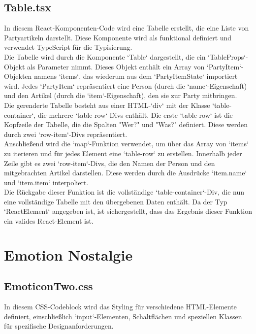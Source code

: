 \documentclass[./dokumentation.tex]{subfiles}
\begin{document}
\subsection{Table.tsx}

In diesem React-Komponenten-Code wird eine Tabelle erstellt, die eine Liste von Partyartikeln darstellt. Diese Komponente wird als funktional definiert und verwendet TypeScript für die Typisierung.\\
Die Tabelle wird durch die Komponente `Table` dargestellt, die ein `TableProps`-Objekt als Parameter nimmt. Dieses Objekt enthält ein Array von `PartyItem`-Objekten namens `items`, das wiederum aus dem `PartyItemState` importiert wird. Jedes `PartyItem` repräsentiert eine Person (durch die `name`-Eigenschaft) und den Artikel (durch die `item`-Eigenschaft), den sie zur Party mitbringen.\\
Die gerenderte Tabelle besteht aus einer HTML-`div` mit der Klasse `table-container`, die mehrere `table-row`-Divs enthält. Die erste `table-row` ist die Kopfzeile der Tabelle, die die Spalten "Wer?" und "Was?" definiert. Diese werden durch zwei `row-item`-Divs repräsentiert.\\
Anschließend wird die `map`-Funktion verwendet, um über das Array von `items` zu iterieren und für jedes Element eine `table-row` zu erstellen. Innerhalb jeder Zeile gibt es zwei `row-item`-Divs, die den Namen der Person und den mitgebrachten Artikel darstellen. Diese werden durch die Ausdrücke `{item.name}` und `{item.item}` interpoliert.\\
Die Rückgabe dieser Funktion ist die vollständige `table-container`-Div, die nun eine vollständige Tabelle mit den übergebenen Daten enthält. Da der Typ `ReactElement` angegeben ist, ist sichergestellt, dass das Ergebnis dieser Funktion ein valides React-Element ist.

\section{Emotion Nostalgie}
\subsection{EmoticonTwo.css}
In diesem CSS-Codeblock wird das Styling für verschiedene HTML-Elemente definiert, einschließlich `input`-Elementen, Schaltflächen und speziellen Klassen für spezifische Designanforderungen.\\
\end{document}
